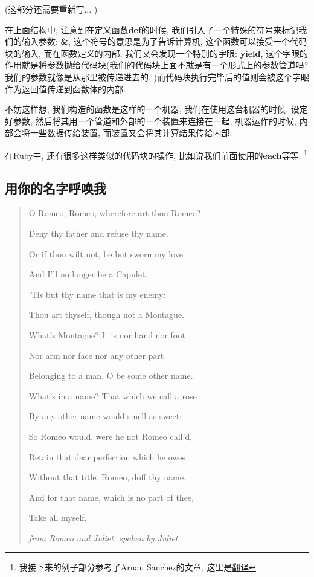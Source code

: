 (这部分还需要重新写... )

在上面结构中, 注意到在定义函数\textbf{def}的时候, 我们引入了一个特殊的符号来标记我们的输入参数: \textbf{\&}, 这个符号的意思是为了告诉计算机, 这个函数可以接受一个代码块的输入, 而在函数定义的内部, 我们又会发现一个特别的字眼: \textbf{yield}, 这个字眼的作用就是将参数抛给代码块(我们的代码块上面不就是有一个形式上的参数管道吗? 我们的参数就像是从那里被传递进去的. )而代码块执行完毕后的值则会被这个字眼作为返回值传递到函数体的内部. 

不妨这样想, 我们构造的函数是这样的一个机器, 我们在使用这台机器的时候, 设定好参数, 然后将其用一个管道和外部的一个装置来连接在一起, 机器运作的时候, 内部会将一些数据传给装置, 而装置又会将其计算结果传给内部. 

\begin{example}
  在Ruby中, 还有很多这样类似的代码块的操作, 比如说我们前面使用的\textbf{each}等等. \footnote{我接下来的例子部分参考了Arnau Sanchez的文章, 这里是\href{https://github.com/JuanitoFatas/Ruby-Functional-Programming}{翻译}}
\end{example}

\subsection{用你的名字呼唤我}
\begin{quotation}
  O Romeo, Romeo, wherefore art thou Romeo?

  Deny thy father and refuse thy name.

  Or if thou wilt not, be but sworn my love

  And I'll no longer be a Capulet.

  `Tis but thy name that is my enemy:

  Thou art thyself, though not a Montague.

  What's Montague? It is nor hand nor foot

  Nor arm nor face nor any other part

  Belonging to a man. O be some other name.

  What's in a name? That which we call a rose

  By any other name would smell as sweet;

  So Romeo would, were he not Romeo call'd,

  Retain that dear perfection which he owes

  Without that title. Romeo, doff thy name,

  And for that name, which is no part of thee,

  Take all myself.

  \emph{from Romeo and Juliet, spoken by Juliet}
\end{quotation}

